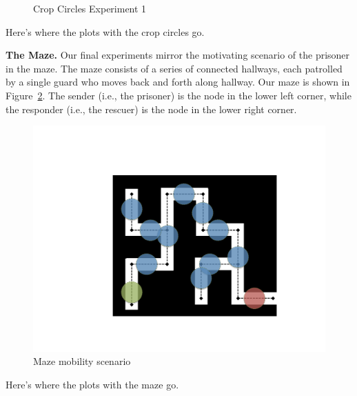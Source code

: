 \begin{figure}
\begin{center}
\end{center}
\vspace{-.4cm}
\caption{Crop Circles Experiment 1}\label{fig:exp1}
\vspace{-.35cm}
\end{figure}

{\color{red}Here's where the plots with the crop circles go.}

{\bf The Maze.} Our final experiments mirror the motivating scenario
of the prisoner in the maze. The maze consists of a series of
connected hallways, each patrolled by a single guard who moves back
and forth along hallway. Our maze is shown in
Figure~\ref{fig:maze}. The sender (i.e., the prisoner) is the node in
the lower left corner, while the responder (i.e., the rescuer) is the
node in the lower right corner.
\begin{figure}
\begin{center}
\includegraphics[width=.9\columnwidth]{figures/newMaze.pdf}
\end{center}
\vspace{-.75cm}
\caption{Maze mobility scenario}
\label{fig:maze}
\vspace{-.5cm}
\end{figure}

{\color{red}Here's where the plots with the maze go.}